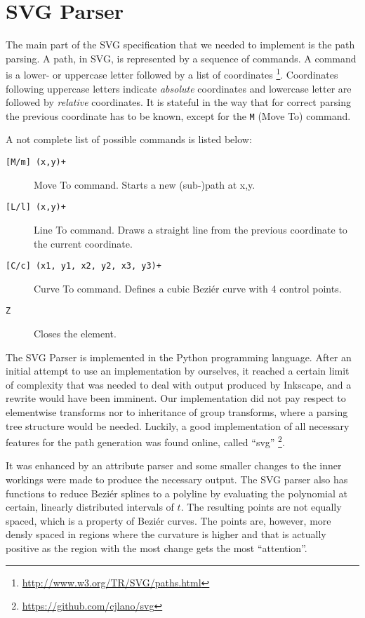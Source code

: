\section{SVG Parser}

The main part of the SVG specification that we needed to implement is the path parsing. A path, in SVG, is represented by a sequence of commands. A command is a lower- or uppercase letter followed by a list of coordinates
\footnote{\url{http://www.w3.org/TR/SVG/paths.html}}. Coordinates following uppercase letters indicate \textit{absolute} coordinates and lowercase letter are followed by \textit{relative} coordinates. It is stateful in the way that for correct parsing the previous coordinate has to be known, except for the \texttt{M} (Move To) command.

A not complete list of possible commands is listed below:

\begin{description}
\item[\texttt{[M/m] (x,y)+}] Move To command. Starts a new (sub-)path at x,y.
\item[\texttt{[L/l] (x,y)+}] Line To command. Draws a straight line from the previous coordinate to the current coordinate.
\item[\texttt{[C/c] (x1, y1, x2, y2, x3, y3)+}] Curve To command. Defines a cubic Beziér curve with 4 control points.
\item[\texttt{Z}] Closes the element.
\end{description} 

The SVG Parser is implemented in the Python programming language. After an initial attempt to use an implementation by ourselves, it reached a certain limit of complexity that was needed to deal with output produced by Inkscape, and a rewrite would have been imminent. Our implementation did not pay respect to elementwise transforms nor to inheritance of group transforms, where a parsing tree structure would be needed. Luckily, a good implementation of all necessary features for the path generation was found online, called \enquote{svg} \footnote{\url{https://github.com/cjlano/svg}}.

It was enhanced by an attribute parser and some smaller changes to the inner workings were made to produce the necessary output. The SVG parser also has functions to reduce Beziér splines to a polyline by evaluating the polynomial at certain, linearly distributed intervals of $t$. The resulting points are not equally spaced, which is a property of Beziér curves. The points are, however, more densly spaced in regions where the curvature is higher and that is actually positive as the region with the most change gets the most \enquote{attention}. 

